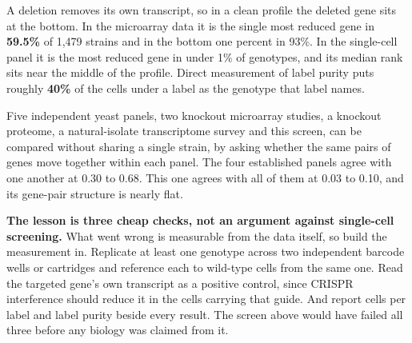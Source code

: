  A deletion removes its own transcript,
so in a clean profile the deleted gene sits at the bottom. In the microarray
data it is the single most reduced gene in \textbf{59.5\%} of 1{,}479 strains
and in the bottom one percent in 93\%. In the single-cell panel it is the most
reduced gene in under 1\% of genotypes, and its median rank sits near the middle
of the profile. Direct measurement of label purity puts roughly \textbf{40\%} of
the cells under a label as the genotype that label names.

 Five
independent yeast panels, two knockout microarray studies, a knockout proteome,
a natural-isolate transcriptome survey and this screen, can be compared without
sharing a single strain, by asking whether the same pairs of genes move together
within each panel. The four established panels agree with one another at 0.30 to
0.68. This one agrees with all of them at 0.03 to 0.10, and its gene-pair
structure is nearly flat.

\begin{keybox}
\textbf{The lesson is three cheap checks, not an argument against single-cell
screening.} What went wrong is measurable from the data itself, so build the
measurement in. Replicate at least one genotype across two independent barcode
wells or cartridges and reference each to wild-type cells from the same one.
Read the targeted gene's own transcript as a positive control, since CRISPR
interference should reduce it in the cells carrying that guide. And report cells
per label and label purity beside every result. The screen above would have
failed all three before any biology was claimed from it.
\end{keybox}
